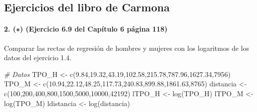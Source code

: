 \documentclass[
]{article}
\newenvironment{Shaded}{\begin{snugshade}}{\end{snugshade}}
\newcommand{\CommentTok}[1]{\textcolor[rgb]{0.56,0.35,0.01}{\textit{#1}}}
\newcommand{\DecValTok}[1]{\textcolor[rgb]{0.00,0.00,0.81}{#1}}
\newcommand{\FloatTok}[1]{\textcolor[rgb]{0.00,0.00,0.81}{#1}}
\newcommand{\FunctionTok}[1]{\textcolor[rgb]{0.00,0.00,0.00}{#1}}
\newcommand{\NormalTok}[1]{#1}
\newcommand{\OtherTok}[1]{\textcolor[rgb]{0.56,0.35,0.01}{#1}}
\begin{document}
\hypertarget{ejercicios-del-libro-de-carmona}{%
\subsection{Ejercicios del libro de
Carmona}\label{ejercicios-del-libro-de-carmona}}

\hypertarget{ejercicio-6.9-del-capuxedtulo-6-puxe1gina-118}{%
\paragraph{2. (∗) (Ejercicio 6.9 del Capítulo 6 página
118)}\label{ejercicio-6.9-del-capuxedtulo-6-puxe1gina-118}}

Comparar las rectas de regresión de hombres y mujeres con los logaritmos
de los datos del ejercicio 1.4.

\begin{Shaded}
\begin{Highlighting}[]
\CommentTok{\# Datos}
\NormalTok{TPO\_H }\OtherTok{\textless{}{-}} \FunctionTok{c}\NormalTok{(}\FloatTok{9.84}\NormalTok{,}\FloatTok{19.32}\NormalTok{,}\FloatTok{43.19}\NormalTok{,}\FloatTok{102.58}\NormalTok{,}\FloatTok{215.78}\NormalTok{,}\FloatTok{787.96}\NormalTok{,}\FloatTok{1627.34}\NormalTok{,}\DecValTok{7956}\NormalTok{)}
\NormalTok{TPO\_M }\OtherTok{\textless{}{-}} \FunctionTok{c}\NormalTok{(}\FloatTok{10.94}\NormalTok{,}\FloatTok{22.12}\NormalTok{,}\FloatTok{48.25}\NormalTok{,}\FloatTok{117.73}\NormalTok{,}\FloatTok{240.83}\NormalTok{,}\FloatTok{899.88}\NormalTok{,}\FloatTok{1861.63}\NormalTok{,}\DecValTok{8765}\NormalTok{)}
\NormalTok{distancia }\OtherTok{\textless{}{-}} \FunctionTok{c}\NormalTok{(}\DecValTok{100}\NormalTok{,}\DecValTok{200}\NormalTok{,}\DecValTok{400}\NormalTok{,}\DecValTok{800}\NormalTok{,}\DecValTok{1500}\NormalTok{,}\DecValTok{5000}\NormalTok{,}\DecValTok{10000}\NormalTok{,}\DecValTok{42192}\NormalTok{)}
\NormalTok{lTPO\_H }\OtherTok{\textless{}{-}} \FunctionTok{log}\NormalTok{(TPO\_H)}
\NormalTok{lTPO\_M }\OtherTok{\textless{}{-}} \FunctionTok{log}\NormalTok{(TPO\_M)}
\NormalTok{ldistancia }\OtherTok{\textless{}{-}} \FunctionTok{log}\NormalTok{(distancia)}
\end{Highlighting}
\end{Shaded}
\end{document}
